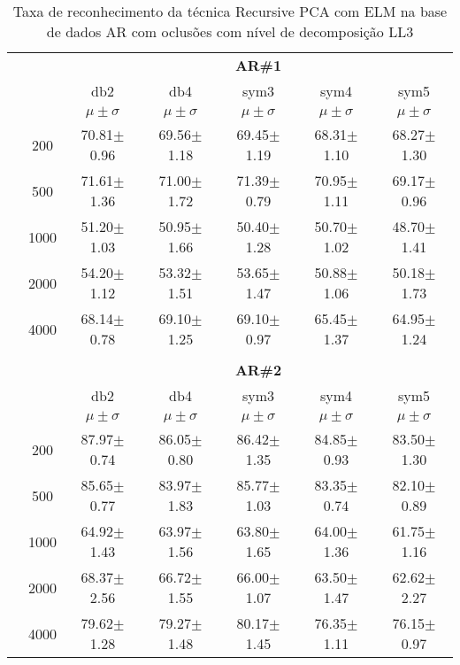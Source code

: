 \begin{table}[H]
	\centering
    \normalsize
	\caption{Taxa de reconhecimento da técnica Recursive PCA com ELM na base de dados AR com oclusões com nível de decomposição LL3}
   \hspace{0.5in}
	\begin{tabular}{|c|c|c c c c c|}
\cline{3-7}
\multicolumn{2}{c|}{\multirow{3}{*}{}} & \multicolumn{5}{c|}{\textbf{AR\#1}}   \\\cline{3-7} 
\multicolumn{2}{c|}{}  & db2 & db4 & sym3 & sym4 & sym5 \\\cline{3-7}%
\multicolumn{2}{c|}{}& $\mu \pm \sigma$ & $\mu \pm \sigma$ & $\mu \pm \sigma$ & $\mu \pm \sigma$ & $\mu \pm \sigma$ \\\hline


\multicolumn{1}{|c|}{ \multirow{5}{*}{\rotatebox[origin=c]{90}{\textbf{Neurônios}}} }
&200	&70.81$\pm$0.96	&69.56$\pm$1.18	&69.45$\pm$1.19	&68.31$\pm$1.10	&68.27$\pm$1.30	\\\cline{2-7}
&500	&71.61$\pm$1.36	&71.00$\pm$1.72	&71.39$\pm$0.79	&70.95$\pm$1.11	&69.17$\pm$0.96	\\\cline{2-7}
&1000	&51.20$\pm$1.03	&50.95$\pm$1.66	&50.40$\pm$1.28	&50.70$\pm$1.02	&48.70$\pm$1.41	\\\cline{2-7}
&2000	&54.20$\pm$1.12	&53.32$\pm$1.51	&53.65$\pm$1.47	&50.88$\pm$1.06	&50.18$\pm$1.73	\\\cline{2-7}
&4000	&68.14$\pm$0.78	&69.10$\pm$1.25	&69.10$\pm$0.97	&65.45$\pm$1.37	&64.95$\pm$1.24	




\\\midrule%

\multicolumn{7}{c}{}\\ 

\cline{3-7}
\multicolumn{2}{c|}{\multirow{3}{*}{}} & \multicolumn{5}{c|}{\textbf{AR\#2}}   \\\cline{3-7} 

\multicolumn{2}{c|}{}  & db2 & db4 & sym3 & sym4 & sym5 \\\cline{3-7}
\multicolumn{2}{c|}{}& $\mu \pm \sigma$ & $\mu \pm \sigma$ & $\mu \pm \sigma$ & $\mu \pm \sigma$ & $\mu \pm \sigma$ \\\hline


\multicolumn{1}{|c|}{ \multirow{5}{*}{\rotatebox[origin=c]{90}{\textbf{Neurônios}}} }
&200	&87.97$\pm$0.74	&86.05$\pm$0.80	&86.42$\pm$1.35	&84.85$\pm$0.93	&83.50$\pm$1.30	\\\cline{2-7}
&500	&85.65$\pm$0.77	&83.97$\pm$1.83	&85.77$\pm$1.03	&83.35$\pm$0.74	&82.10$\pm$0.89	\\\cline{2-7}
&1000	&64.92$\pm$1.43 &63.97$\pm$1.56	&63.80$\pm$1.65	&64.00$\pm$1.36	&61.75$\pm$1.16	\\\cline{2-7}
&2000	&68.37$\pm$2.56	&66.72$\pm$1.55	&66.00$\pm$1.07	&63.50$\pm$1.47	&62.62$\pm$2.27	\\\cline{2-7}
&4000	&79.62$\pm$1.28	&79.27$\pm$1.48	&80.17$\pm$1.45	&76.35$\pm$1.11	&76.15$\pm$0.97	





\end{tabular}
\end{table}
